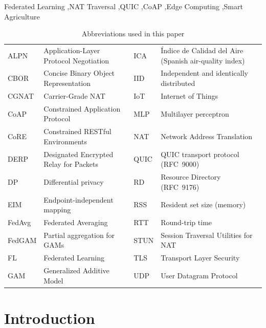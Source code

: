 \begin{keywords}
Federated Learning \sep NAT Traversal \sep QUIC \sep CoAP \sep Edge Computing \sep Smart Agriculture
\end{keywords}

\maketitle

\begin{table}[!t]
\caption{Abbreviations used in this paper}
\label{tab:abbrev}
\scriptsize
\setlength{\tabcolsep}{3pt}
\begin{tabular}{@{}l p{2.9cm} l p{2.9cm}@{}}
\toprule
ALPN & Application-Layer Protocol Negotiation & ICA & \'Indice de Calidad del Aire (Spanish air-quality index) \\
CBOR & Concise Binary Object Representation & IID & Independent and identically distributed \\
CGNAT & Carrier-Grade NAT & IoT & Internet of Things \\
CoAP & Constrained Application Protocol & MLP & Multilayer perceptron \\
CoRE & Constrained RESTful Environments & NAT & Network Address Translation \\
DERP & Designated Encrypted Relay for Packets & QUIC & QUIC transport protocol (RFC~9000) \\
DP & Differential privacy & RD & Resource Directory (RFC~9176) \\
EIM & Endpoint-independent mapping & RSS & Resident set size (memory) \\
FedAvg & Federated Averaging & RTT & Round-trip time \\
FedGAM & Partial aggregation for GAMs & STUN & Session Traversal Utilities for NAT \\
FL & Federated Learning & TLS & Transport Layer Security \\
GAM & Generalized Additive Model & UDP & User Datagram Protocol \\
\bottomrule
\end{tabular}
\end{table}

\section{Introduction}
\label{sec:introduction}

